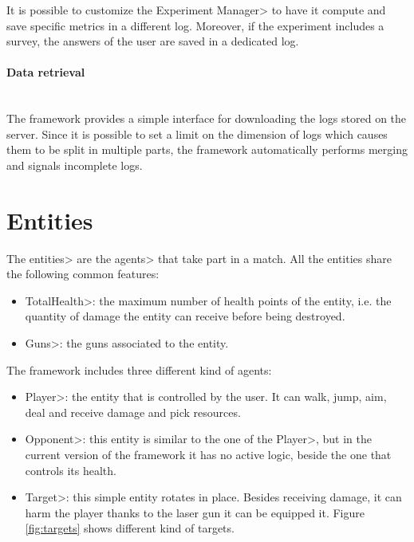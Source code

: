 It is possible to customize the \<Experiment Manager> to have it compute and save specific metrics in a different log. Moreover, if the experiment includes a survey, the answers of the user are saved in a dedicated log.

\paragraph{Data retrieval}

\mbox{}\\

{\setlength{\parindent}{0cm}
The framework provides a simple interface for downloading the logs stored on the server. Since it is possible to set a limit on the dimension of logs which causes them to be split in multiple parts, the framework automatically performs merging and signals incomplete logs.
}


\section{Entities}

The \<entities> are the \<agents> that take part in a match. All the entities share the following common features:

\begin{itemize}
\item \<TotalHealth>: the maximum number of health points of the entity, i.e. the quantity of damage the entity can receive before being destroyed.
\item \<Guns>: the guns associated to the entity.
\end{itemize}

The framework includes three different kind of agents:

\begin{itemize}
\item \<Player>: the entity that is controlled by the user. It can walk, jump, aim, deal and receive damage and pick resources.
\item \<Opponent>: this entity is similar to the one of the \<Player>, but in the current version of the framework it has no active logic, beside the one that controls its health.
\item \<Target>: this simple entity rotates in place. Besides receiving damage, it can harm the player thanks to the laser gun it can be equipped it. Figure \ref{fig:targets} shows different kind of targets.
\end{itemize}

